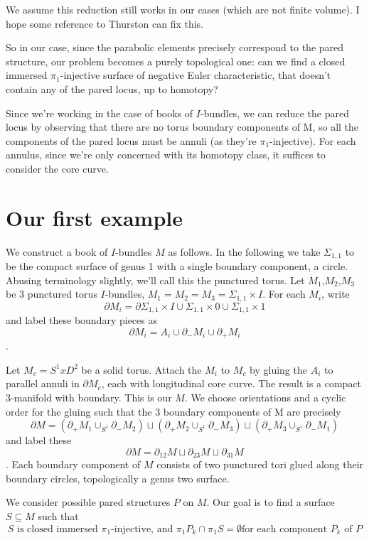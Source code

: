 \documentclass[12pt]{amsart}
\theoremstyle{definition}
\newcommand{\x}{\times}
\newcommand{\bd}{\partial}
\newcommand{\Si}{\Sigma}
\newcommand{\cin}{\subseteq}
\begin{document}
We assume this reduction still works in our cases (which are not finite
volume). I hope some reference to Thurston can fix this.

So in our case, since the parabolic elements precisely correspond to the pared
structure, our problem becomes a purely topological one: can we find a closed
immersed $\pi_1$-injective surface of negative Euler characteristic, that
doesn't contain any of the pared locus, up to homotopy?

Since we're working in the case of books of $I$-bundles, we can reduce the
pared locus by observing that there are no torus boundary components of M, so
all the components of the pared locus must be annuli (as they're
$\pi_1$-injective). For each annulus, since we're only concerned with its
homotopy class, it suffices to consider the core curve.

\section{Our first example}

We construct a book of $I$-bundles $M$ as follows. In the following we take
$\Si_{1,1}$ to be the compact surface of genus 1 with a single boundary
component, a circle.  Abusing terminology slightly, we'll call this the
punctured torus.  Let $M_1$,$M_2$,$M_3$ be 3 punctured torus $I$-bundles,
$M_1=M_2=M_3=\Si_{1,1}\x I$. For each $M_i$, write
\[
\bd M_i = \bd \Si_{1,1}\x I \cup \Si_{1,1}\x0 \cup \Si_{1,1} \x 1
\]
and label these boundary pieces as
\[
\bd M_i = A_i \cup \bd_- M_i \cup \bd_+M_i
\].

Let $M_c = S^1xD^2$ be a solid torus. Attach the $M_i$ to $M_c$ by gluing the
$A_i$ to parallel annuli in $\bd M_c$, each with longitudinal core curve. The
result is a compact 3-manifold with boundary. This is our $M$. We choose
orientations and a cyclic order for the gluing such that the 3 boundary
components of M are precisely
\[
\bd M = (\bd_+M_1 \cup_{S^1} \bd_-M_2) \sqcup (\bd_+M_2 \cup_{S^1} \bd_-M_3)
\sqcup (\bd_+M_3 \cup_{S^1} \bd_-M_1)
\]
and label these
\[
\bd M=\bd_{12}M \sqcup \bd_{23}M \sqcup \bd_{31}M
\].
Each boundary
component of $M$ consists of two punctured tori glued along their boundary
circles, topologically a genus two surface.

We consider possible pared structures $P$ on $M$. Our goal is to find
a surface $S \cin M$ such that
\begin{equation}\label{E:qf}
S \text{ is closed immersed $\pi_1$-injective, and  $\pi_1P_k \cap \pi_1S
= \emptyset$
for each component $P_k$ of $P$} \tag{\textasteriskcentered}
\end{equation}
\end{document}
